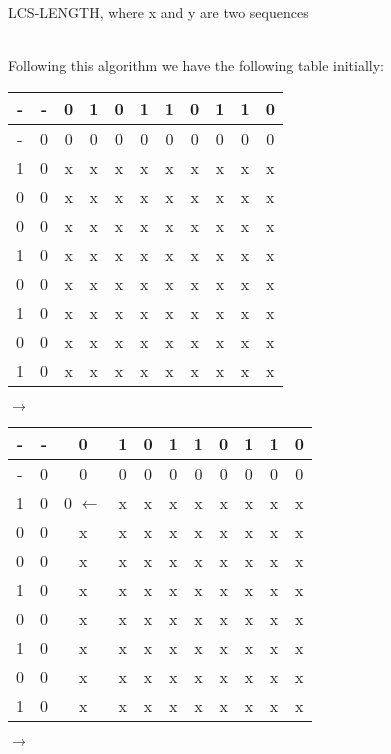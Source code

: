 \documentclass[11pt]{article}
\begin{document}
\begin{enumerate}
\begin{algorithm}
{{{                    }
                }
            }
        \caption{LCS-LENGTH, where x and y are two sequences}
    \end{algorithm}
    \\ Following this algorithm we have the following table initially:
    \\
    \begin{tabular}{ c | c c c c c c c c c c } 
        - & - & 0 & 1 & 0 & 1 & 1 & 0 & 1 & 1 & 0 \\
        \hline
        - & 0 & 0 & 0 & 0 & 0 & 0 & 0 & 0 & 0 & 0 \\
        1 & 0 & x & x & x & x & x & x & x & x & x \\
        0 & 0 & x & x & x & x & x & x & x & x & x \\
        0 & 0 & x & x & x & x & x & x & x & x & x \\
        1 & 0 & x & x & x & x & x & x & x & x & x \\
        0 & 0 & x & x & x & x & x & x & x & x & x \\
        1 & 0 & x & x & x & x & x & x & x & x & x \\
        0 & 0 & x & x & x & x & x & x & x & x & x \\
        1 & 0 & x & x & x & x & x & x & x & x & x \\
    \end{tabular}
    $\rightarrow$
    \begin{tabular}{ c | c c c c c c c c c c } 
        - & - & 0 & 1 & 0 & 1 & 1 & 0 & 1 & 1 & 0 \\
        \hline
        - & 0 & 0 & 0 & 0 & 0 & 0 & 0 & 0 & 0 & 0 \\
        1 & 0 & 0 $\leftarrow$ & x & x & x & x & x & x & x & x \\
        0 & 0 & x & x & x & x & x & x & x & x & x \\
        0 & 0 & x & x & x & x & x & x & x & x & x \\
        1 & 0 & x & x & x & x & x & x & x & x & x \\
        0 & 0 & x & x & x & x & x & x & x & x & x \\
        1 & 0 & x & x & x & x & x & x & x & x & x \\
        0 & 0 & x & x & x & x & x & x & x & x & x \\
        1 & 0 & x & x & x & x & x & x & x & x & x \\
    \end{tabular}
    $\rightarrow$ \\

\end{enumerate}
\end{document}
